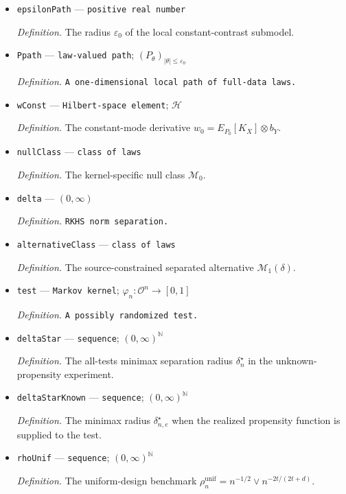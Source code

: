 \documentclass{article}
\begin{document}
\begin{itemize}
  \item \texttt{epsilonPath} --- \texttt{positive real number}
  \par\smallskip\noindent\emph{Definition.} The radius \(\varepsilon_0\) of the local constant-contrast submodel.
  \item \texttt{Ppath} --- \texttt{law-\allowbreak{}valued path}; \((P_\theta)_{|\theta|\le\varepsilon_0}\)
  \par\smallskip\noindent\emph{Definition.} \texttt{A one-\allowbreak{}dimensional local path of full-\allowbreak{}data laws.}
  \item \texttt{wConst} --- \texttt{Hilbert-\allowbreak{}space element}; \(\mathcal H\)
  \par\smallskip\noindent\emph{Definition.} The constant-mode derivative \(w_0=E_{P_0}[K_X]\otimes b_Y\).
  \item \texttt{nullClass} --- \texttt{class of laws}
  \par\smallskip\noindent\emph{Definition.} The kernel-specific null class \(\mathcal M_0\).
  \item \texttt{delta} --- \((0,\infty)\)
  \par\smallskip\noindent\emph{Definition.} \texttt{RKHS norm separation.}
  \item \texttt{alternativeClass} --- \texttt{class of laws}
  \par\smallskip\noindent\emph{Definition.} The source-constrained separated alternative \(\mathcal M_1(\delta)\).
  \item \texttt{test} --- \texttt{Markov kernel}; \(\varphi_n:\mathcal O^n\to[0,1]\)
  \par\smallskip\noindent\emph{Definition.} \texttt{A possibly randomized test.}
  \item \texttt{deltaStar} --- \texttt{sequence}; \((0,\infty)^{\mathbb N}\)
  \par\smallskip\noindent\emph{Definition.} The all-tests minimax separation radius \(\delta_n^\star\) in the unknown-propensity experiment.
  \item \texttt{deltaStarKnown} --- \texttt{sequence}; \((0,\infty)^{\mathbb N}\)
  \par\smallskip\noindent\emph{Definition.} The minimax radius \(\delta_{n,e}^\star\) when the realized propensity function is supplied to the test.
  \item \texttt{rhoUnif} --- \texttt{sequence}; \((0,\infty)^{\mathbb N}\)
  \par\smallskip\noindent\emph{Definition.} The uniform-design benchmark \(\rho_n^{\mathrm{unif}}=n^{-1/2}\vee n^{-2t/(2t+d)}\).

\end{itemize}
\end{document}
